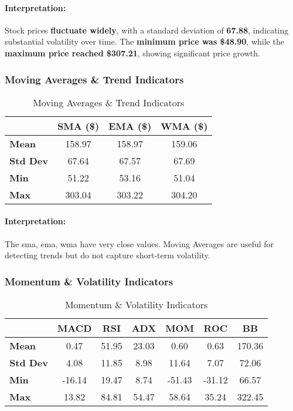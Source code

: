 \paragraph{Interpretation:}
Stock prices \textbf{fluctuate widely}, with a standard deviation of \textbf{67.88}, indicating substantial volatility over time.
The \textbf{minimum price was \$48.90}, while the \textbf{maximum price reached \$307.21}, showing significant price growth.

\subsubsection{Moving Averages \& Trend Indicators}

\begin{table}[H]
    \centering
    \caption{Moving Averages \& Trend Indicators}
    \label{tab:moving_averages}
    \begin{tabular}{lccc}
        \hline
        & \textbf{SMA (\$)} & \textbf{EMA (\$)} & \textbf{WMA (\$)} \\
        \hline\hline
        \textbf{Mean} & 158.97 & 158.97 & 159.06 \\
        \textbf{Std Dev} & 67.64 & 67.57 & 67.69 \\
        \textbf{Min} & 51.22 & 53.16 & 51.04 \\
        \textbf{Max} & 303.04 & 303.22 & 304.20 \\
        \hline
    \end{tabular}
\end{table}

\paragraph{Interpretation:}
The \acrshort{sma}, \acrshort{ema}, \acrshort{wma} have very close values.
Moving Averages are useful for detecting trends but do not capture short-term volatility.

\subsubsection{Momentum \& Volatility Indicators}
\begin{table}[H]
    \centering
    \caption{Momentum \& Volatility Indicators}
    \label{tab:momentum_volatility}
    \begin{tabular}{lcccccc}
        \hline
         & \textbf{MACD} & \textbf{RSI} & \textbf{ADX} & \textbf{MOM} & \textbf{ROC} & \textbf{BB} \\
        \hline\hline
        \textbf{Mean} & 0.47 & 51.95 & 23.03 & 0.60 & 0.63 & 170.36 \\
        \textbf{Std Dev} & 4.08 & 11.85 & 8.98 & 11.64 & 7.07 & 72.06 \\
        \textbf{Min} & -16.14 & 19.47 & 8.74 & -51.43 & -31.12 & 66.57 \\
        \textbf{Max} & 13.82 & 84.81 & 54.47 & 58.64 & 35.24 & 322.45 \\
        \hline
    \end{tabular}
\end{table}

